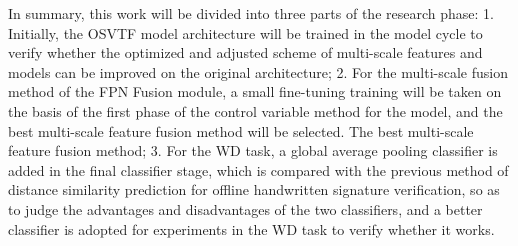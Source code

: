 In summary, this work will be divided into three parts of the research phase: 1. Initially, the OSVTF model architecture will be trained in the model cycle to verify whether the optimized and adjusted scheme of multi-scale features and models can be improved on the original architecture; 2. For the multi-scale fusion method of the FPN Fusion module, a small fine-tuning training will be taken on the basis of the first phase of the control variable method for the model, and the best multi-scale feature fusion method will be selected. The best multi-scale feature fusion method; 3. For the WD task, a global average pooling classifier is added in the final classifier stage, which is compared with the previous method of distance similarity prediction for offline handwritten signature verification, so as to judge the advantages and disadvantages of the two classifiers, and a better classifier is adopted for experiments in the WD task to verify whether it works.












